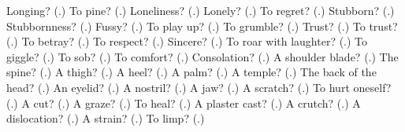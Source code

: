 \begin{tcolorbox}[breakable,colback=teal!4,colframe=teal!35!black,title={Before you move on}]
Longing? (\textbf{}.) To pine? (\textbf{}.) Loneliness? (\textbf{}.) Lonely? (\textbf{}.) To regret? (\textbf{}.) Stubborn? (\textbf{}.) Stubbornness? (\textbf{}.) Fussy? (\textbf{}.) To play up? (\textbf{}.) To grumble? (\textbf{}.) Trust? (\textbf{}.) To trust? (\textbf{}.) To betray? (\textbf{}.) To respect? (\textbf{}.) Sincere? (\textbf{}.) To roar with laughter? (\textbf{}.) To giggle? (\textbf{}.) To sob? (\textbf{}.) To comfort? (\textbf{}.) Consolation? (\textbf{}.) A shoulder blade? (\textbf{}.) The spine? (\textbf{}.) A thigh? (\textbf{}.) A heel? (\textbf{}.) A palm? (\textbf{}.) A temple? (\textbf{}.) The back of the head? (\textbf{}.) An eyelid? (\textbf{}.) A nostril? (\textbf{}.) A jaw? (\textbf{}.) A scratch? (\textbf{}.) To hurt oneself? (\textbf{}.) A cut? (\textbf{}.) A graze? (\textbf{}.) To heal? (\textbf{}.) A plaster cast? (\textbf{}.) A crutch? (\textbf{}.) A dislocation? (\textbf{}.) A strain? (\textbf{}.) To limp? (\textbf{}.)
\end{tcolorbox}
